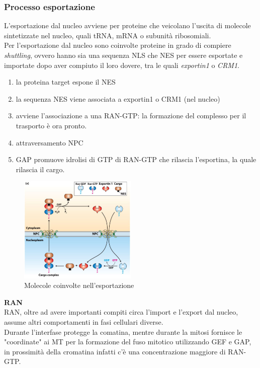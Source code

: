         \subsubsection{Processo esportazione}
            L'esportazione dal nucleo avviene per proteine che veicolano l'uscita di molecole sintetizzate nel nucleo, quali tRNA, mRNA o subunità ribosomiali.\\
            Per l'esportazione dal nucleo sono coinvolte proteine in grado di compiere \textit{shuttling}, ovvero hanno sia una sequenza NLS che NES per essere esportate e importate dopo aver compiuto il loro dovere, tra le quali \textit{exportin1} o \textit{CRM1}.
            \begin{enumerate}
                \item la proteina target espone il NES
                \item la sequenza NES viene associata a exportin1 o CRM1 (nel nucleo)
                \item avviene l'associazione a una RAN-GTP: la formazione del complesso per il trasporto è ora pronto.
                \item attraversamento NPC
                \item GAP promuove idrolisi di GTP di RAN-GTP che rilascia l'esportina, la quale rilascia il cargo.
            \end{enumerate}
            \begin{figure}[h]
                \centering
                \includegraphics[width=0.5\textwidth]{images/exportNucleo.JPG}
                \caption{\small Molecole coinvolte nell'esportazione}
                \label{fig:mesh1}
            \end{figure}
            
            \textbf{RAN}\\
                RAN, oltre ad avere importanti compiti circa l'import e l'export dal nucleo, assume altri comportamenti in fasi cellulari diverse.\\
                Durante l'interfase protegge la comatina, mentre durante la mitosi fornisce le "coordinate" ai MT per la formazione del fuso mitotico utilizzando GEF e GAP, in prossimità della cromatina infatti c'è una concentrazione maggiore di RAN-GTP.
                
